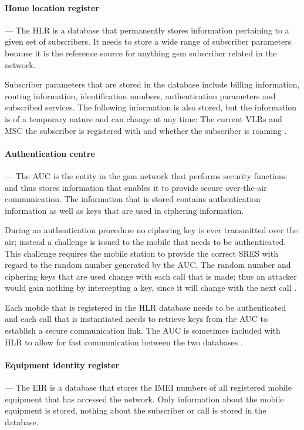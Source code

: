 \paragraph{Home location register}
--- The \gls{HLR} is a database that permanently stores information pertaining to a given set of subscribers. It needs to store a wide range of subscriber parameters because it is the reference source for anything \gls{gsm} subscriber related in the network\cite{GSMSysEngin}. 

Subscriber parameters that are stored in the database include billing information, routing information, identification numbers, authentication parameters and subscribed services\cite{GSMSysEngin}. The following information is also stored, but the information is of a temporary nature and can change at any time: The current \glspl{VLR} and \gls{MSC} the subscriber is registered with and whether the subscriber is roaming \cite{GSMSysEngin}.

\paragraph{Authentication centre}
--- The AUC is the entity in the \gls{gsm} network that performs security functions and thus stores information that enables it to provide secure over-the-air communication\cite{GSM92,GSMSysEngin}. The information that is stored contains authentication information as well as keys that are used in ciphering information\cite{GSM92,GSMSysEngin}.

During an authentication procedure no ciphering key is ever transmitted over the air; instead a challenge is issued to the mobile that needs to be authenticated. This challenge requires the mobile station to provide the correct \gls{SRES} with regard to the random number generated by the \gls{AUC}\cite{GSM92,GSMSysEngin}. The random number and ciphering keys that are used change with each call that is made; thus an attacker would gain nothing by intercepting a key, since it will change with the next call \cite{GSMSysEngin}.

Each mobile that is registered in the \gls{HLR} database needs to be authenticated and each call that is instantiated needs to retrieve keys from the AUC to establish a secure communication link\cite{GSM92,GSMSysEngin}. The AUC is sometimes included with \gls{HLR} to allow for fast communication between the two databases \cite{GSMSysEngin}.

\paragraph{Equipment identity register}
--- The \gls{EIR} is a database that stores the \gls{IMEI} numbers of all registered mobile equipment that has accessed the network\cite{GSMSysEngin}. Only information about the mobile equipment is stored, nothing about the subscriber or call is stored in the database\cite{GSMSysEngin}.

